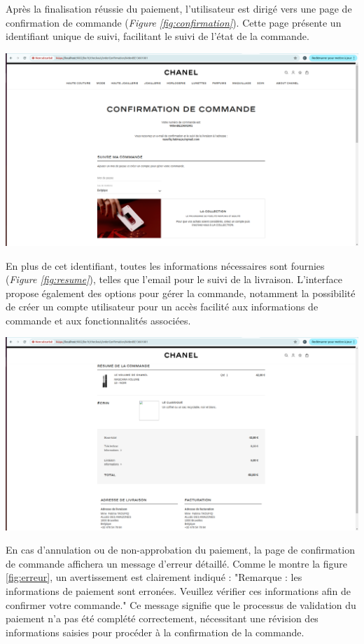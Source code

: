 Après la finalisation réussie du paiement, l'utilisateur est dirigé vers une page de confirmation de commande (\textit{Figure \ref{fig:confirmation}}). Cette page présente un identifiant unique de suivi, facilitant le suivi de l'état de la commande. 
\begin{center}
    \centering
    \includegraphics[width=19cm]{Figures/Screens/confirmation du commande.png}
    \label{fig:confirmation}
\end{center}
En plus de cet identifiant, toutes les informations nécessaires sont fournies (\textit{Figure \ref{fig:resume}}), telles que l'email pour le suivi de la livraison. L'interface propose également des options pour gérer la commande, notamment la possibilité de créer un compte utilisateur pour un accès facilité aux informations de commande et aux fonctionnalités associées.
\begin{center}
    \centering
    \includegraphics[width=19cm]{Figures/Screens/resumer commande.png}
    \label{fig:resume}
\end{center}
En cas d'annulation ou de non-approbation du paiement, la page de confirmation de commande affichera un message d'erreur détaillé. Comme le montre la figure \ref{fig:erreur}, un avertissement est clairement indiqué : "Remarque : les informations de paiement sont erronées. Veuillez vérifier ces informations afin de confirmer votre commande." Ce message signifie que le processus de validation du paiement n'a pas été complété correctement, nécessitant une révision des informations saisies pour procéder à la confirmation de la commande.
